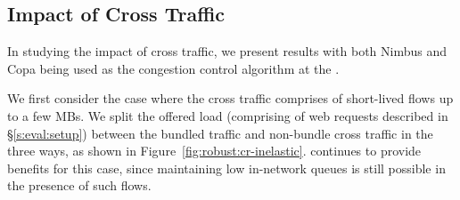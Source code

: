 \subsection{Impact of Cross Traffic}
\label{s:robust:cross}
In studying the impact of cross traffic, we present results with both Nimbus and Copa being used as the congestion control algorithm at the \inbox.


 We first consider the case where the cross traffic comprises of short-lived flows up to a few MBs.
We split the offered load (comprising of web requests described in \S\ref{s:eval:setup}) between the bundled traffic and non-bundle cross traffic in the three ways, as shown in Figure~\ref{fig:robust:cr-inelastic}. \name continues to provide benefits for this case, since maintaining low in-network queues is still possible in the presence of such flows.

